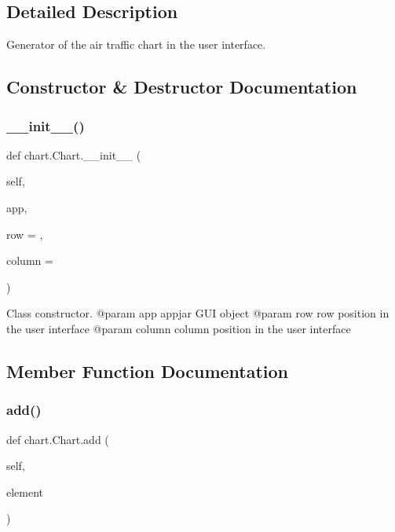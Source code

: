 \subsection{Detailed Description}
\begin{DoxyVerb}Generator of the air traffic chart in the user interface.\end{DoxyVerb}
 

\subsection{Constructor \& Destructor Documentation}
\mbox{\label{classchart_1_1_chart_ac34f8a32979d39fca87fe1f69fd266d0}} 
\subsubsection{\texorpdfstring{\+\_\+\+\_\+init\+\_\+\+\_\+()}{\_\_init\_\_()}}
{\footnotesize\ttfamily def chart.\+Chart.\+\_\+\+\_\+init\+\_\+\+\_\+ (\begin{DoxyParamCaption}\item[{}]{self,  }\item[{}]{app,  }\item[{}]{row = {},  }\item[{}]{column = {} }\end{DoxyParamCaption})}

\begin{DoxyVerb}Class constructor.
    @param app       appjar GUI object
    @param row       row position in the user interface
    @param column    column position in the user interface
\end{DoxyVerb}
 

\subsection{Member Function Documentation}
\mbox{\label{classchart_1_1_chart_a0eaaeae9230e9bbbd4bf3a8b8d9626e0}} 
\subsubsection{\texorpdfstring{add()}{add()}}
{\footnotesize\ttfamily def chart.\+Chart.\+add (\begin{DoxyParamCaption}\item[{}]{self,  }\item[{}]{element }\end{DoxyParamCaption})}

